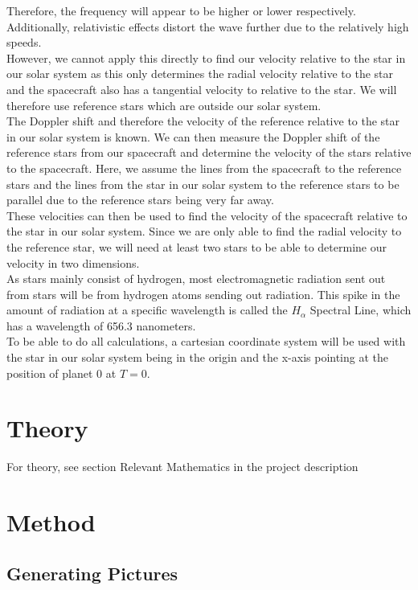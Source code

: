 \documentclass[reprint,english,notitlepage]{revtex4-2}
\begin{document}
Therefore, the frequency will appear to be higher or lower respectively.
Additionally, relativistic effects distort the wave further due to the relatively high speeds.\\
However, we cannot apply this directly to find our velocity relative to the star in our solar system as this only determines the radial velocity relative to the star and the spacecraft also has a tangential velocity to relative to the star.
We will therefore use reference stars which are outside our solar system.\\
The Doppler shift and therefore the velocity of the reference relative to the star in our solar system is known.
We can then measure the Doppler shift of the reference stars from our spacecraft and determine the velocity of the stars relative to the spacecraft.
Here, we assume the lines from the spacecraft to the reference stars and the lines from the star in our solar system to the reference stars to be parallel due to the reference stars being very far away.\\
These velocities can then be used to find the velocity of the spacecraft relative to the star in our solar system.
Since we are only able to find the radial velocity to the reference star, we will need at least two stars to be able to determine our velocity in two dimensions.\\
As stars mainly consist of hydrogen, most electromagnetic radiation sent out from stars will be from hydrogen atoms sending out radiation.
This spike in the amount of radiation at a specific wavelength is called the $H_{\alpha}$ Spectral Line, which has a wavelength of 656.3 nanometers.\\
To be able to do all calculations, a cartesian coordinate system will be used with the star in our solar system being in the origin and the x-axis pointing at the position of planet 0 at $T = 0$.

\section{Theory} \label{sec:theory}
For theory, see section Relevant Mathematics in the project description%

\section{Method} \label{sec:method}
\subsection{Generating Pictures} \label{subsec: generating pictures}
\end{document}
